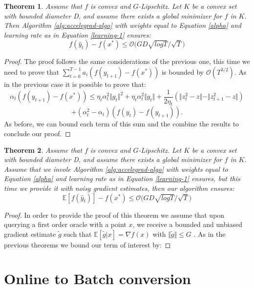 \documentclass[12pt]{article}
\newtheorem{theorem}{Theorem}
\theoremstyle{definition}
\begin{document}
\begin{theorem}
Assume that $f$ is convex and $G$-Lipschitz. Let $K$ be a convex set with bounded diameter D, and assume there exists a global minimizer for $f$ in $K$. Then Algorithm \ref{alg:accelegrad-algo} with weights equal to Equation \ref{alpha} and learning rate as in Equation \ref{learning-1} ensures:
$$
f(\hat y_t) - f(x^*) \leq \mathcal{O} \bigg ( GD \sqrt{log T} / \sqrt{T} \bigg)
$$
\label{Theorem-2-acc}
\end{theorem}

\begin{proof}
The proof follows the same considerations of the previous one, this time we need to prove that $\sum_{t=0}^{T-1} a_i ( f(y_{t+1}) - f(x^*) )$ is bounded by $\mathcal{O}(T^{3/2})$. As in the previous case it is possible to prove that:
$$
\alpha_t (f(y_{t+1}) - f(x^*)) \leq \eta_t \alpha_t^2 \Vert g_t \Vert^2 + \eta_t \alpha_t^2 \Vert g_t \Vert + \frac{1}{2 \eta_t} ( \Vert z_t^2 - z \Vert - \Vert z_{t+1}^2 - z \Vert) 
$$
$$
+ (\alpha_t^2 -\alpha_t)(f(y_t)-f(y_{t+1})).
$$
As before, we can bound each term of this sum and the combine the results to conclude our proof.
\end{proof}

\begin{theorem}
Assume that $f$ is convex and $G$-Lipschitz. Let $K$ be a convex set with bounded diameter D, and assume there exists a global minimizer for $f$ in $K$. Assume that we invole Algorithm \ref{alg:accelegrad-algo} with weights equal to Equation \ref{alpha} and learning rate as in Equation \ref{learning-1} ensures, but this time we provide it with noisy gradient estimates, then our algorithm ensures:
$$
\mathbb{E}[f(\hat y_t)] - f(x^*) \leq \mathcal{O} \bigg ( GD \sqrt{log T} / \sqrt{T} \bigg)
$$
\label{Theorem-2-acc}
\end{theorem}

\begin{proof}
In order to provide the proof of this theorem we assume that upon querying a first order oracle with a point $x$, we receive a bounded and unbiased gradient estimate $\tilde g$ such that $\mathbb{E}[\tilde g | x] = \nabla f(x)$ with $\Vert \tilde g \Vert \leq G$	. As in the previous theorems we bound our term of interest by:

\end{proof}


\section{Online to Batch conversion}
\end{document}

